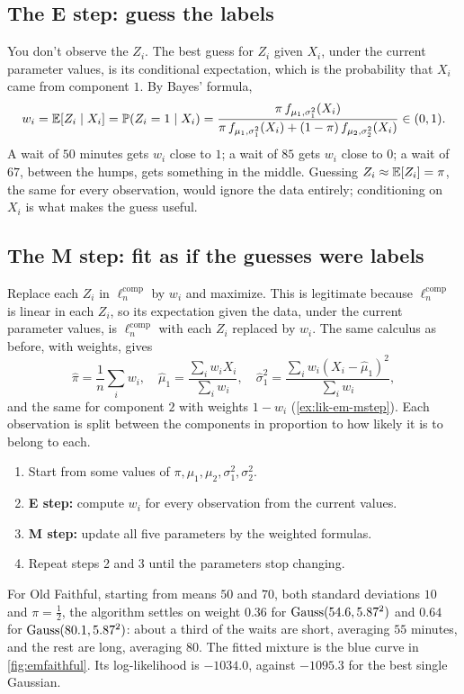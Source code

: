 \subsection*{The E step: guess the labels}

You don't observe the $Z_i$.
The best guess for $Z_i$ given $X_i$, under the current parameter values, is its conditional expectation, which is the probability that $X_i$ came from component $1$.
By Bayes' formula,
\[
w_i = \operatorname*{\mathbb{E}}[Z_i \mid X_i] = \mathbb{P}(Z_i = 1 \mid X_i) = \frac{\pi\, f_{\mu_1, \sigma_1^2}(X_i)}{\pi\, f_{\mu_1, \sigma_1^2}(X_i) + (1 - \pi)\, f_{\mu_2, \sigma_2^2}(X_i)} \in (0, 1).
\]
A wait of $50$ minutes gets $w_i$ close to $1$; a wait of $85$ gets $w_i$ close to $0$; a wait of $67$, between the humps, gets something in the middle.
Guessing $Z_i \approx \operatorname*{\mathbb{E}}[Z_i] = \pi$, the same for every observation, would ignore the data entirely; conditioning on $X_i$ is what makes the guess useful.

\subsection*{The M step: fit as if the guesses were labels}

Replace each $Z_i$ in $\ell_n^{\text{comp}}$ by $w_i$ and maximize.
This is legitimate because $\ell_n^{\text{comp}}$ is linear in each $Z_i$, so its expectation given the data, under the current parameter values, is $\ell_n^{\text{comp}}$ with each $Z_i$ replaced by $w_i$.
The same calculus as before, with weights, gives
\[
\hat{\pi} = \frac1n\sum_i w_i, \quad \hat{\mu}_1 = \frac{\sum_i w_i X_i}{\sum_i w_i}, \quad \hat{\sigma}_1^2 = \frac{\sum_i w_i (X_i - \hat{\mu}_1)^2}{\sum_i w_i},
\]
and the same for component $2$ with weights $1 - w_i$ (\cref{ex:lik-em-mstep}).
Each observation is split between the components in proportion to how likely it is to belong to each.

\begin{worked}
\begin{enumerate}[nosep]
\item Start from some values of $\pi, \mu_1, \mu_2, \sigma_1^2, \sigma_2^2$.
\item \textbf{E step:} compute $w_i$ for every observation from the current values.
\item \textbf{M step:} update all five parameters by the weighted formulas.
\item Repeat steps 2 and 3 until the parameters stop changing.
\end{enumerate}
For Old Faithful, starting from means $50$ and $70$, both standard deviations $10$ and $\pi = \frac12$, the algorithm settles on weight $0.36$ for $\text{Gauss}(54.6, 5.87^2)$ and $0.64$ for $\text{Gauss}(80.1, 5.87^2)$: about a third of the waits are short, averaging $55$ minutes, and the rest are long, averaging $80$. The fitted mixture is the blue curve in \cref{fig:emfaithful}. Its log-likelihood is $-1034.0$, against $-1095.3$ for the best single Gaussian.
\end{worked}

